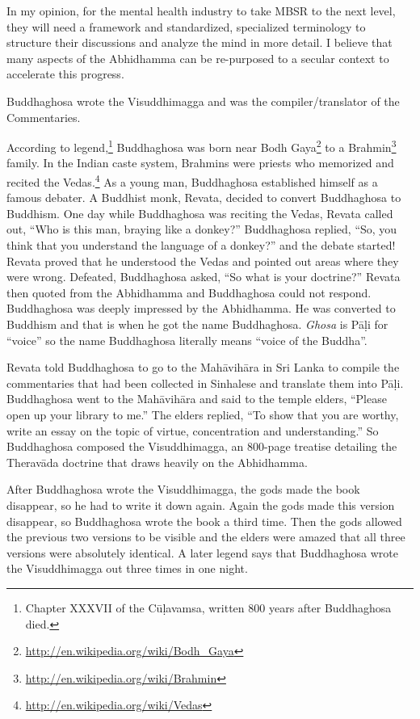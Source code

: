 In my opinion, for the mental health industry to take MBSR to the next level, they will need a framework and standardized, specialized terminology to structure their discussions and analyze the mind in more detail. I believe that many aspects of the Abhidhamma can be re-purposed to a secular context to accelerate this progress.

\pagebreak


Buddhaghosa wrote the Visuddhimagga and was the compiler/translator of the Commentaries.

According to legend,\footnote{Chapter XXXVII of the Cūḷavamsa, written 800 years after Buddhaghosa died.} Buddhaghosa was born near Bodh Gaya\footnote{\url{http://en.wikipedia.org/wiki/Bodh_Gaya}} to a Brahmin\footnote{\url{http://en.wikipedia.org/wiki/Brahmin}} family. In the Indian caste system, Brahmins were priests who memorized and recited the Vedas.\footnote{\url{http://en.wikipedia.org/wiki/Vedas}} As a young man, Buddhaghosa established himself as a famous debater. A Buddhist monk, Revata, decided to convert Buddhaghosa to Buddhism. One day while Buddhaghosa was reciting the Vedas, Revata called out, “Who is this man, braying like a donkey?” Buddhaghosa replied, “So, you think that you understand the language of a donkey?” and the debate started! Revata proved that he understood the Vedas and pointed out areas where they were wrong. Defeated, Buddhaghosa asked, “So what is your doctrine?” Revata then quoted from the Abhidhamma and Buddhaghosa could not respond. Buddhaghosa was deeply impressed by the Abhidhamma. He was converted to Buddhism and that is when he got the name Buddhaghosa. \textit{Ghosa} is Pāḷi for “voice” so the name Buddhaghosa literally means “voice of the Buddha”.

Revata told Buddhaghosa to go to the Mahāvihāra in Sri Lanka to compile the commentaries that had been collected in Sinhalese and translate them into Pāḷi. Buddhaghosa went to the Mahāvihāra and said to the temple elders, “Please open up your library to me.” The elders replied, “To show that you are worthy, write an essay on the topic of virtue, concentration and understanding.” So Buddhaghosa composed the Visuddhimagga, an 800-page treatise detailing the Theravāda doctrine that draws heavily on the Abhidhamma.

After Buddhaghosa wrote the Visuddhimagga, the gods made the book disappear, so he had to write it down again. Again the gods made this version disappear, so Buddhaghosa wrote the book a third time. Then the gods allowed the previous two versions to be visible and the elders were amazed that all three versions were absolutely identical. A later legend says that Buddhaghosa wrote the Visuddhimagga out three times in one night. 

